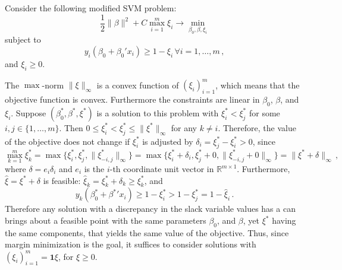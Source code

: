 \documentclass[a4paper]{article}
\newcommand{\Real}{\mathbb{R}}
\newcommand{\one}{\mathbf{1}}
\begin{document}
Consider the following modified SVM problem:
\begin{equation*}
  \frac{1}{2}\|\beta\|^2 + C\max_{i=1}^m \xi_i \to \min_{\beta_0, \beta, \xi_i}
\end{equation*}
subject to
\begin{equation*}
  y_i(\beta_0 + \beta_0'x_i) \geq 1 - \xi_i\, \forall i=1,\ldots, m\,,
\end{equation*}
and $\xi_i \geq 0$.

The $\max$-norm $\|\xi\|_\infty$ is a convex function of $(\xi_i)_{i=1}^m$, which
means that the objective function is convex. Furthermore the constraints are linear
in $\beta_0$, $\beta$, and $\xi_i$. Suppose $(\beta^*_0, \beta^*, \xi^*)$ is a solution
to this problem with $\xi^*_i < \xi^*_j$ for some $i, j\in\{1,\ldots, m\}$. Then
$0\leq \xi^*_i < \xi^*_j \leq \|\xi^*\|_\infty$ for any $k\neq i$. Therefore, the
value of the objective does not change if $\xi^*_i$ is adjusted by $\delta_i = \xi^*_j - \xi^*_i > 0$,
since
\begin{equation*}
  \max_{k=1}^m \xi^*_k
    = \max\{\xi^*_i, \xi^*_j, \|\xi^*_{-i,j}\|_\infty\}
    = \max\{\xi^*_i + \delta_i, \xi^*_j + 0, \|\xi^*_{-i,j} + 0\|_\infty\}
    = \|\xi^* + \delta\|_\infty \,,
\end{equation*}
where $\delta = e_i \delta_i$ and $e_i$ is the $i$-th coordinate unit vector in
$\Real^{m\times 1}$. Furthermore, $\hat{\xi} = \xi^* + \delta$ is feasible:
$\hat{\xi}_k = \xi^*_k + \delta_k \geq \xi^*_k$, and
\begin{equation*}
  y_k(\beta^*_0 + {\beta^*}'x_i)
    \geq 1 - \xi^*_i > 1 - \xi^*_j = 1 - \hat{\xi}_i \,.
\end{equation*}
Therefore any solution with a discrepancy in the slack variable values has a can
brings about a feasible point with the same parameters $\beta_0$, and $\beta$, yet
$\xi^*$ having the same components, that yields the same value of the objective.
Thus, since margin minimization is the goal, it suffices to consider solutions with
$(\xi_i)_{i=1}^m = \one \xi$, for $\xi \geq 0$.
\end{document}
